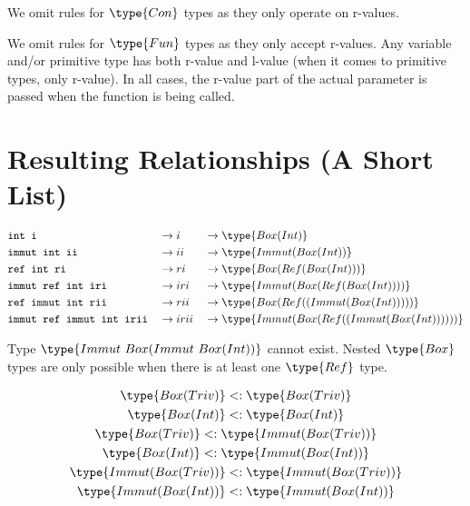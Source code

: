 \documentclass{article}
\newcommand\subtype{\mathrel{<:}}
\newcommand{\syntax}{\texttt}
\begin{document}
We omit rules for $\type{Con}$ types as they only operate on r-values.

\medskip

We omit rules for $\type{Fun}$ types as they only accept r-values.
Any variable and/or primitive type has both r-value and l-value (when it comes
to primitive types, only r-value). In all cases, the r-value part of the actual
parameter is passed when the function is being called.


\section*{Resulting Relationships (A Short List)}

\begin{align*}
  &\syntax{int i}                    &&\to i    &&\to \type{Box(Int)}\\
  &\syntax{immut int ii}             &&\to ii   &&\to \type{Immut(Box(Int))}\\
  &\syntax{ref int ri}               &&\to ri   &&\to \type{Box(Ref(Box(Int)))}\\
  &\syntax{immut ref int iri}        &&\to iri  &&\to \type{Immut(Box(Ref(Box(Int))))}\\
  &\syntax{ref immut int rii}        &&\to rii  &&\to \type{Box(Ref((Immut(Box(Int)))))}\\
  &\syntax{immut ref immut int irii} &&\to irii &&\to \type{Immut(Box(Ref((Immut(Box(Int))))))}
\end{align*}

\medskip

Type $\type{Immut\ Box(Immut\ Box(Int))}$ cannot exist. Nested $\type{Box}$
types are only possible when there is at least one $\type{Ref}$ type.

\begin{gather*}
  \type{Box(Triv)}        \subtype \type{Box(Triv)}\\
  \type{Box(Int)}         \subtype \type{Box(Int)}\\
  \type{Box(Triv)}        \subtype \type{Immut(Box(Triv))}\\
  \type{Box(Int)}         \subtype \type{Immut(Box(Int))}\\
  \type{Immut(Box(Triv))} \subtype \type{Immut(Box(Triv))}\\
  \type{Immut(Box(Int))}  \subtype \type{Immut(Box(Int))}
\end{gather*}
\end{document}
